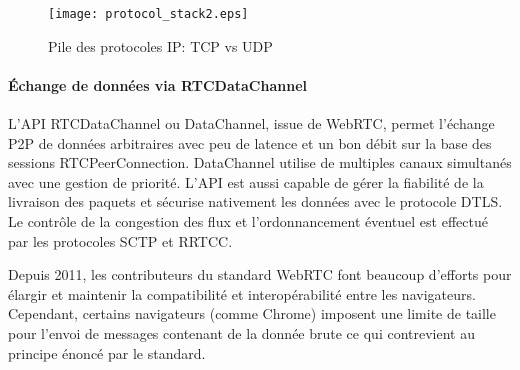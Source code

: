 \begin{figure}[ht]
	\centering
	\texttt{[image: protocol\_stack2.eps]}
	\caption{Pile des protocoles IP: TCP vs UDP}
	\label{fig:protocolstack}
\end{figure}
\paragraph{Échange de données via RTCDataChannel}
L'\gls{API} RTCDataChannel ou Data\-Channel, issue de  WebRTC, 
permet l'échange \gls{P2P} de données arbitraires avec peu de latence et 
un bon débit sur la base des sessions RTCPeerConnection.
DataChannel utilise de multiples canaux simultanés avec une gestion de 
priorité. L'\gls{API} est aussi capable de gérer la fiabilité de la livraison des 
paquets et sécurise nativement les données avec le protocole 
\gls{DTLS}. 
Le contrôle de la congestion des flux et l'ordonnancement éventuel est 
effectué par les protocoles \gls{SCTP} et \gls{RRTCC}. 


Depuis 2011, les contributeurs du standard WebRTC font beaucoup 
d'efforts pour élargir et maintenir la compatibilité et interopérabilité entre les navigateurs.
Cependant, certains navigateurs (comme Chrome) imposent une limite de taille 
pour l'envoi de messages contenant de la donnée brute ce qui contrevient au 
principe énoncé par le standard.

